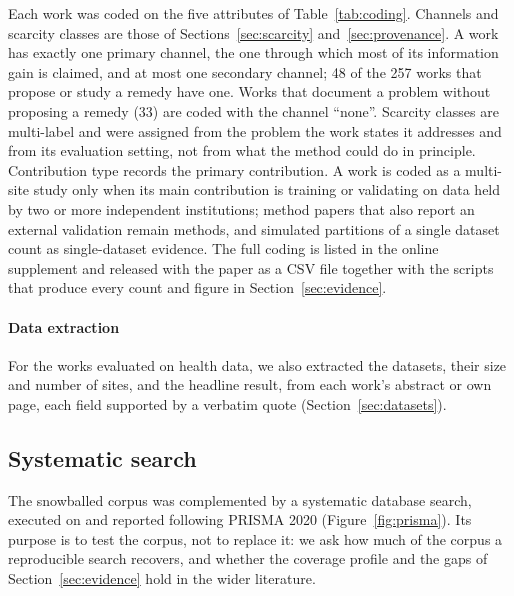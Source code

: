 \documentclass[acmsmall,screen,review]{acmart}
\theoremstyle{acmdefinition}
\begin{document}
Each work was coded on the five attributes of Table~\ref{tab:coding}. Channels and scarcity classes are those of Sections~\ref{sec:scarcity} and~\ref{sec:provenance}. A work has exactly one primary channel, the one through which most of its information gain is claimed, and at most one secondary channel; 48 of the 257 works that propose or study a remedy have one. Works that document a problem without proposing a remedy (33) are coded with the channel ``none''. Scarcity classes are multi-label and were assigned from the problem the work states it addresses and from its evaluation setting, not from what the method could do in principle. Contribution type records the primary contribution. A work is coded as a multi-site study only when its main contribution is training or validating on data held by two or more independent institutions; method papers that also report an external validation remain methods, and simulated partitions of a single dataset count as single-dataset evidence. The full coding is listed in the online supplement and released with the paper as a CSV file together with the scripts that produce every count and figure in Section~\ref{sec:evidence}.

\paragraph{Data extraction} For the works evaluated on health data, we also extracted the datasets, their size and number of sites, and the headline result, from each work's abstract or own page, each field supported by a verbatim quote (Section~\ref{sec:datasets}).

\subsection{Systematic search}\label{sec:search}

The snowballed corpus was complemented by a systematic database search, executed on \PrismaSearchDate{} and reported following PRISMA 2020 \cite{page2021prisma} (Figure~\ref{fig:prisma}). Its purpose is to test the corpus, not to replace it: we ask how much of the corpus a reproducible search recovers, and whether the coverage profile and the gaps of Section~\ref{sec:evidence} hold in the wider literature.
\end{document}
